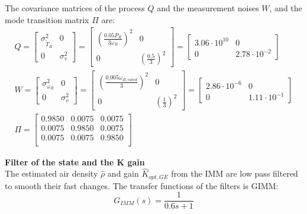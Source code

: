 The covariance matrices of the process $Q$ and the measurement noises $W$, and the mode transition matrix $\Pi$ are:
\begin{gather}
  Q = \begin{bmatrix}
    \sigma_{\tilde{T}_R}^2 & 0 \\
    0 & \sigma_v^2
  \end{bmatrix} =
  \begin{bmatrix}
    \left(\frac{0.05 P_R}{3\omega_R}\right)^2 & 0 \\
    0 & \left(\frac{0.5}{3}\right)^2
  \end{bmatrix} =
  \begin{bmatrix}
    3.06\cdot10^{10} & 0 \\
    0 & 2.78\cdot10^{-2}
  \end{bmatrix} \\
  W = \begin{bmatrix}
    \sigma_{\omega_R}^2 & 0 \\
    0 & \sigma_{v}^2
  \end{bmatrix} =
  \begin{bmatrix}
    \left(\frac{0.005 \omega_{R,rated}}{3}\right)^2 & 0 \\
    0 & \left(\frac{1}{3}\right)^2
  \end{bmatrix} =
  \begin{bmatrix}
    2.86\cdot10^{-6} & 0 \\
    0 & 1.11\cdot10^{-1}
  \end{bmatrix} \\
  \Pi=
  \begin{bmatrix}
    0.9850  &  0.0075  &  0.0075\\
    0.0075  &  0.9850  &  0.0075\\
    0.0075  &  0.0075  &  0.9850\\
  \end{bmatrix}
\end{gather}

\textbf{Filter of the state and the K gain}\\
The estimated air density $\hat{\rho}$ and gain $\hat{K}_{opt,GE}$ from the IMM are low pass filtered to smooth their fast changes. The transfer functions of the filters is \acrshort{GIMM}:  
\begin{equation}
  G_{IMM}(s) = \frac{1}{0.6s + 1}
\end{equation}

